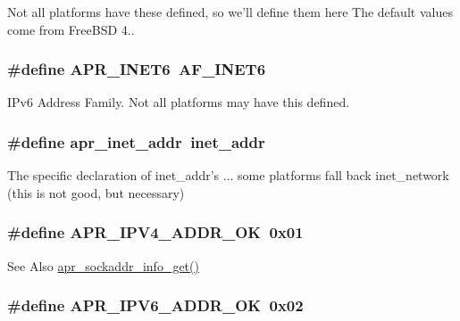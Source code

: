 Not all platforms have these defined, so we'll define them here The default values come from Free\-B\-S\-D 4.. \hypertarget{group__apr__network__io_gad09d9ea8995f50f35073ae0c77efb44f}{
\subsubsection[{A\-P\-R\-\_\-\-I\-N\-E\-T6}]{\setlength{\rightskip}{0pt plus 5cm}\#define A\-P\-R\-\_\-\-I\-N\-E\-T6~A\-F\-\_\-\-I\-N\-E\-T6}}\label{group__apr__network__io_gad09d9ea8995f50f35073ae0c77efb44f}
I\-Pv6 Address Family. Not all platforms may have this defined. \hypertarget{group__apr__network__io_ga46a8b06887871cfd60a3e37385775e22}{
\subsubsection[{apr\-\_\-inet\-\_\-addr}]{\setlength{\rightskip}{0pt plus 5cm}\#define apr\-\_\-inet\-\_\-addr~inet\-\_\-addr}}\label{group__apr__network__io_ga46a8b06887871cfd60a3e37385775e22}
The specific declaration of inet\-\_\-addr's ... some platforms fall back inet\-\_\-network (this is not good, but necessary) \hypertarget{group__apr__network__io_ga58aa30a94127b4a80f27fbf2e03fdfd8}{
\subsubsection[{A\-P\-R\-\_\-\-I\-P\-V4\-\_\-\-A\-D\-D\-R\-\_\-\-O\-K}]{\setlength{\rightskip}{0pt plus 5cm}\#define A\-P\-R\-\_\-\-I\-P\-V4\-\_\-\-A\-D\-D\-R\-\_\-\-O\-K~0x01}}\label{group__apr__network__io_ga58aa30a94127b4a80f27fbf2e03fdfd8}
\begin{DoxySeeAlso}{See Also}
\hyperlink{group__apr__network__io_gaa2f399ca2b60b35c0abf7630298c6c9f}{apr\-\_\-sockaddr\-\_\-info\-\_\-get()} 
\end{DoxySeeAlso}
\hypertarget{group__apr__network__io_gaef1f70f9b969d25832a230f429837207}{
\subsubsection[{A\-P\-R\-\_\-\-I\-P\-V6\-\_\-\-A\-D\-D\-R\-\_\-\-O\-K}]{\setlength{\rightskip}{0pt plus 5cm}\#define A\-P\-R\-\_\-\-I\-P\-V6\-\_\-\-A\-D\-D\-R\-\_\-\-O\-K~0x02}}\label{group__apr__network__io_gaef1f70f9b969d25832a230f429837207}
